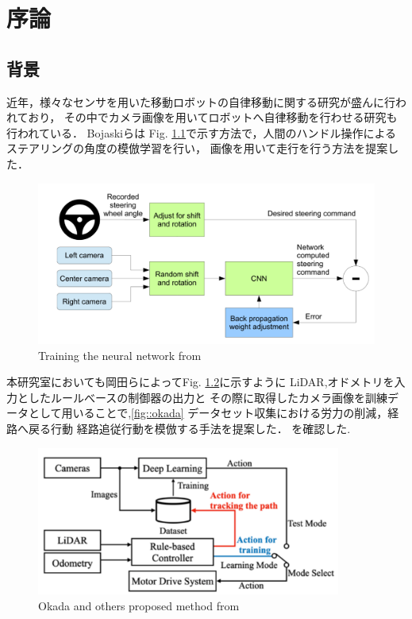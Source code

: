 \chapter{序論}
\section{背景}
近年，様々なセンサを用いた移動ロボットの自律移動に関する研究が盛んに行われており，
その中でカメラ画像を用いてロボットへ自律移動を行わせる研究も行われている．
Bojaskiら\cite{Nvidia}は
Fig. \ref{fig::nvidia}で示す方法で，人間のハンドル操作によるステアリングの角度の模倣学習を行い，
画像を用いて走行を行う方法を提案した．

\begin{figure}[h]
    \centering
    \includegraphics[width = 13cm]{./figs/EndtoEnd_Learning_for_Self-Driving_Cars.pdf}
    \caption{Training the neural network from \cite{Nvidia}}
    \label{fig::nvidia}
\end{figure}

\newpage
本研究室においても岡田ら\cite{okada}によってFig. \ref{fig::okada_sys}に示すように
LiDAR,オドメトリを入力としたルールべースの制御器の出力と
その際に取得したカメラ画像を訓練データとして用いることで,\ref{fig::okada}
データセット収集における労力の削減，経路へ戻る行動
経路追従行動を模倣する手法を提案した．
を確認した.
\begin{figure}[h]
    \centering
    \includegraphics[width = 10cm]{./figs/okada_sys.png}
    \caption{Okada and others proposed method from \cite{okada}}
    \label{fig::okada_sys}
\end{figure}

